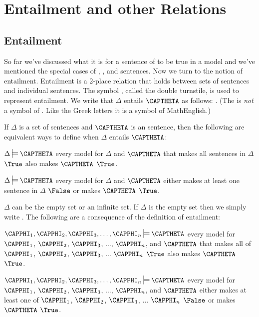\section{Entailment and other Relations}

\subsection{Entailment}\label{Entailment}
So far we've discussed what it is for a sentence of \GSL{} to be true in a model and we've mentioned the special cases of , , and  sentences. 
Now we turn to the notion of entailment. 
Entailment is a 2-place relation that holds between sets of sentences and individual sentences.  The symbol \mention{$\:\sdtstile{}{}\:$}, called the double turnstile,\index{$\sdtstile{}{}$} is used to represent entailment. 
We write that $\Delta$ entails $\CAPTHETA$ as follows: \mention{\:$\Delta\sdtstile{}{}\CAPTHETA\:$}. 
(The \mention{\:$\sdtstile{}{}\:$} is \emph{not} a symbol of \GSL{}. 
Like the Greek letters it is a symbol of MathEnglish.)

\begin{majorILnc}{}
	If $\Delta$ is a set of \GSL{} sentences and $\CAPTHETA$ is an \GSL{} sentence, then the following are equivalent ways to define when $\Delta$ entails $\CAPTHETA$:
	\begin{cenumerate}
		\item $\Delta\sdtstile{}{}\CAPTHETA$ \Iff every model for $\Delta$ and $\CAPTHETA$ that makes all sentences in $\Delta$ $\True$ also makes $\CAPTHETA$ $\True$.
		\item $\Delta\sdtstile{}{}\CAPTHETA$ \Iff every model for $\Delta$ and $\CAPTHETA$ either makes at least one sentence in $\Delta$ $\False$ or makes $\CAPTHETA$ $\True$.
	\end{cenumerate}
\end{majorILnc}

\noindent{}$\Delta$ can be the empty set or an infinite set. 
If $\Delta$ is the empty set then we simply write \mention{$\:\sdtstile{}{}\CAPTHETA$}. The following are a consequence of the definition of entailment:

\begin{cenumerate}
		\item $\CAPPHI_1,\CAPPHI_2,\CAPPHI_3,\ldots,\CAPPHI_{\integer{n}}\sdtstile{}{}\CAPTHETA$ \Iff every model for $\CAPPHI_1$, $\CAPPHI_2$, $\CAPPHI_3$, $\ldots$, $\CAPPHI_{\integer{n}}$, and $\CAPTHETA$ that makes all of $\CAPPHI_1$, $\CAPPHI_2$, $\CAPPHI_3$, $\ldots$ $\CAPPHI_{\integer{n}}$ $\True$ also makes $\CAPTHETA$ $\True$.
		\item $\CAPPHI_1,\CAPPHI_2,\CAPPHI_3,\ldots,\CAPPHI_{\integer{n}}\sdtstile{}{}\CAPTHETA$ \Iff every model for $\CAPPHI_1$, $\CAPPHI_2$, $\CAPPHI_3$, $\ldots$, $\CAPPHI_{\integer{n}}$, and $\CAPTHETA$ either makes at least one of $\CAPPHI_1$, $\CAPPHI_2$, $\CAPPHI_3$, $\ldots$ $\CAPPHI_{\integer{n}}$ $\False$ or makes $\CAPTHETA$ $\True$.
\end{cenumerate}


